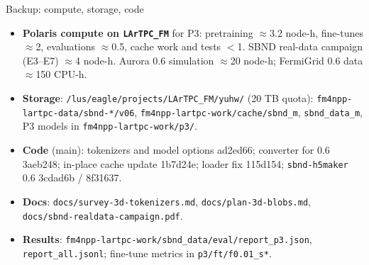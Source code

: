 \documentclass[aspectratio=169,10pt]{beamer}
\newcommand{\code}[1]{\texttt{#1}}
\begin{document}
\begin{frame}{Backup: compute, storage, code}
  \scriptsize
  \begin{itemize}\setlength{\itemsep}{3pt}
    \item \textbf{Polaris compute on \code{LArTPC\_FM}} for P3: pretraining $\approx$3.2 node-h, fine-tunes $\approx$2, evaluations $\approx$0.5, cache work and
      tests $<$1. SBND real-data campaign (E3--E7) $\approx$4 node-h. Aurora 0.6 simulation $\approx$20 node-h; FermiGrid 0.6 data $\approx$150 CPU-h.
    \item \textbf{Storage}: \code{/lus/eagle/projects/LArTPC\_FM/yuhw/} (20 TB quota): \code{fm4npp-lartpc-data/sbnd-*/v06}, \code{fm4npp-lartpc-work/cache/sbnd\_m},
      \code{sbnd\_data\_m}, P3 models in \code{fm4npp-lartpc-work/p3/}.
    \item \textbf{Code} (main): tokenizers and model options ad2ed66; converter for 0.6 3aeb248; in-place cache update 1b7d24e; loader fix 115d154;
      \code{sbnd-h5maker} 0.6 3cdad6b / 8f31637.
    \item \textbf{Docs}: \code{docs/survey-3d-tokenizers.md}, \code{docs/plan-3d-blobs.md}, \code{docs/sbnd-realdata-campaign.pdf}.
    \item \textbf{Results}: \code{fm4npp-lartpc-work/sbnd\_data/eval/report\_p3.json}, \code{report\_all.jsonl}; fine-tune metrics in \code{p3/ft/f0.01\_s*}.
  \end{itemize}
\end{frame}
\end{document}
